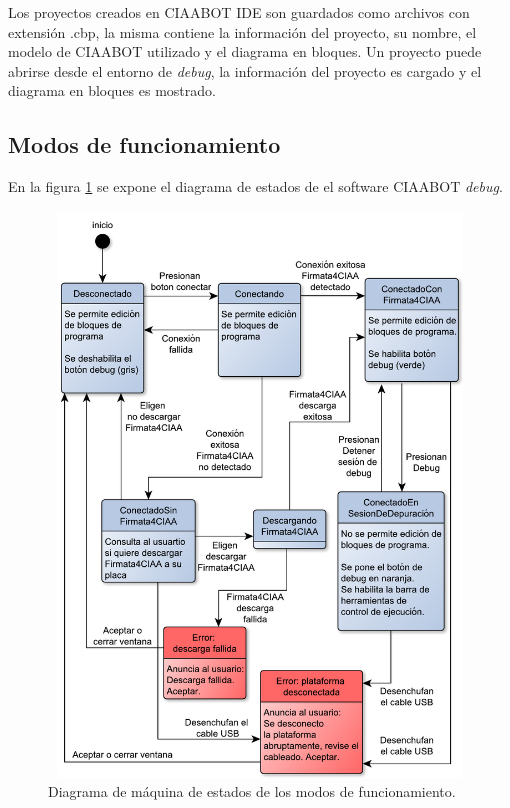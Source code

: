 Los proyectos creados en CIAABOT IDE son guardados como archivos con extensión .cbp, la misma contiene la información del proyecto, su nombre, el modelo de CIAABOT utilizado
y el diagrama en bloques. Un proyecto puede abrirse desde el entorno de \emph{debug}, la información del proyecto es cargado y el diagrama en bloques es mostrado.

\subsection{Modos de funcionamiento}
\label{subsec:Modos de funcionamiento}

En la figura \ref{fig:diagrama-estados} se expone el diagrama de estados de el software CIAABOT \emph{debug}.


\begin{figure}[!htbp]
	\begin{center}  %
		\includegraphics*[width=15cm,height=15cm]{./Figures/diagrama-estados.pdf}
		\par\caption{Diagrama de máquina de estados de los modos de funcionamiento.}\label{fig:diagrama-estados}
	\end{center}
\end{figure}


